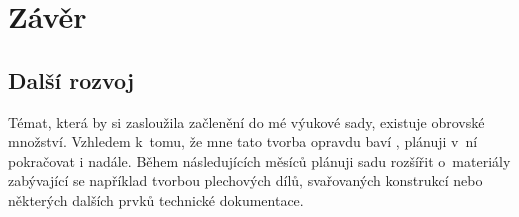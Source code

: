 \chapter*{Závěr}

\large\B{\textcolor{mygreen}{PŠ: Tuto část ještě dopíšu, musím se dorozmyslet jak to napsat. All in all jsem stejně už tak unavenej, že bych do pěti minut usnul. :-)}}

\normalsize

\section{Další rozvoj}
\B{\textcolor{red}{PŠ: Odsunout do závěru?}}\newline
Témat, která by si zasloužila začlenění do mé výukové sady, existuje obrovské množství.
Vzhledem k~tomu, že mne tato tvorba opravdu baví \B{\textcolor{yellow}{(napiš tam něco o tom, že tě to nejenom baví, ale že je to i významná pomoc studentům, ale i pedagogům)}} , plánuji v~ní pokračovat i nadále.
Během následujících měsíců plánuji sadu rozšířit o~materiály zabývající se například tvorbou plechových dílů, svařovaných konstrukcí nebo některých dalších prvků technické dokumentace.

\newpage